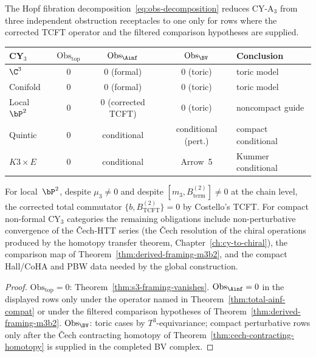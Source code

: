 \begin{proposition}
\label{prop:obs-landscape}
The Hopf fibration decomposition~\eqref{eq:obs-decomposition}
reduces CY-A$_3$ from three independent obstruction receptacles
to one only for rows where the corrected TCFT operator and the
filtered comparison hypotheses are supplied.
\begin{center}
\renewcommand{\arraystretch}{1.2}
\small
\begin{tabular}{lcccl}
 \toprule
 \textbf{CY$_3$} & $\mathrm{Obs}_{\mathrm{top}}$ &
 $\mathrm{Obs}_{\Ainf}$ & $\mathrm{Obs}_{\BV}$ &
 \textbf{Conclusion} \\
 \midrule
 $\C^3$ & $0$ & $0$ (formal) & $0$ (toric) & toric model \\
 Conifold & $0$ & $0$ (formal) & $0$ (toric) & toric model \\
 Local $\bP^2$ & $0$ & $0$ (corrected TCFT) & $0$ (toric) &
 noncompact guide \\
 Quintic & $0$ & conditional & conditional (pert.) &
 compact conditional \\
 $K3 \times E$ & $0$ & conditional & Arrow~5 &
 Kummer conditional \\
 \bottomrule
\end{tabular}
\end{center}
For local~$\bP^2$, despite $\mu_3 \neq 0$ and despite
$[m_3, B^{(2)}_{\mathrm{term}}] \neq 0$ at the chain level, the
corrected total commutator
$\{b, B^{(2)}_{\mathrm{TCFT}}\} = 0$ by Costello's TCFT.  For
compact non-formal CY$_3$ categories the remaining obligations
include non-perturbative convergence of the \v{C}ech-HTT series
(the \v{C}ech resolution of the chiral operations produced by the
homotopy transfer theorem, Chapter~\ref{ch:cy-to-chiral}), the
comparison map of Theorem~\ref{thm:derived-framing-m3b2}, and the
compact Hall/CoHA and PBW data needed by the global construction.
\end{proposition}

\begin{proof}
$\mathrm{Obs}_{\mathrm{top}} = 0$: Theorem~\ref{thm:s3-framing-vanishes}.
$\mathrm{Obs}_{\Ainf} = 0$ in the displayed rows only under the
operator named in Theorem~\ref{thm:total-ainf-compat} or under
the filtered comparison hypotheses of
Theorem~\ref{thm:derived-framing-m3b2}.
$\mathrm{Obs}_{\BV}$: toric cases by $T^3$-equivariance; compact
perturbative rows only after the \v{C}ech contracting homotopy of
Theorem~\ref{thm:cech-contracting-homotopy} is supplied in the
completed BV complex.
\end{proof}

